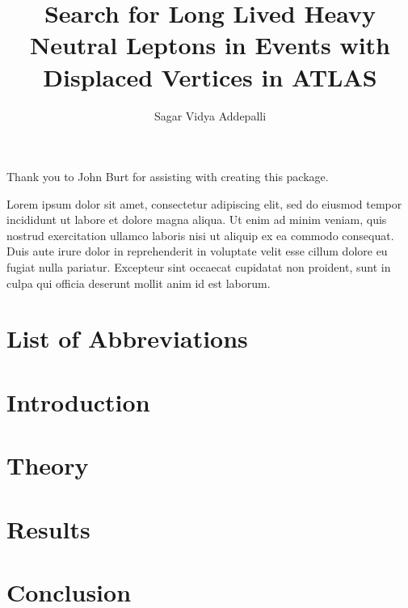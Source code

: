 \documentclass{brandeis-dissertation3.14}
\title{Search for Long Lived Heavy Neutral Leptons in Events with Displaced Vertices in ATLAS }
\author{Sagar Vidya Addepalli}
\begin{document}
\maketitlepage
\makeapproval
\frontmatter

\begin{dissertation-acknowledgements}
Thank you to John Burt for assisting with creating this package.
\end{dissertation-acknowledgements}

\begin{dissertation-abstract}
Lorem ipsum dolor sit amet, consectetur adipiscing elit, sed do eiusmod tempor incididunt ut labore et dolore magna aliqua. Ut enim ad minim veniam, quis nostrud exercitation ullamco laboris nisi ut aliquip ex ea commodo consequat. Duis aute irure dolor in reprehenderit in voluptate velit esse cillum dolore eu fugiat nulla pariatur. Excepteur sint occaecat cupidatat non proident, sunt in culpa qui officia deserunt mollit anim id est laborum.
\end{dissertation-abstract}

\doublespacing

\tableofcontents{}

\clearpage

\listoftables
\pagebreak
{}
\listoffigures
\pagebreak
\chapter{List of Abbreviations}

\startbody

\chapter{Introduction}
\label{chap:intro}


\chapter{Theory}
\label{chap:theory}


\chapter{Results}
\label{chap:results}


\chapter{Conclusion}
\label{chap:conclusion}


%
%
\printbibliography
\end{document}
